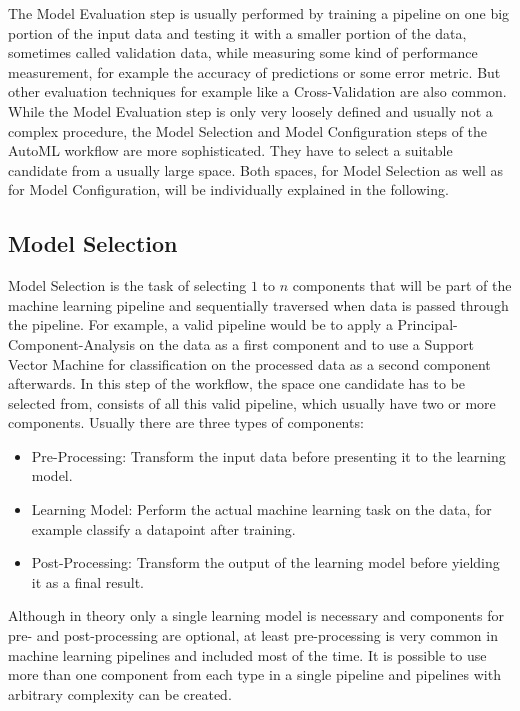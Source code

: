 The Model Evaluation step is usually performed by training a pipeline on one big portion of the input data and testing it with a smaller portion of the data, sometimes called validation data, while measuring some kind of performance measurement, for example the accuracy of predictions or some error metric.
But other evaluation techniques for example like a Cross-Validation are also common.\newline
While the Model Evaluation step is only very loosely defined and usually not a complex procedure, the Model Selection and Model Configuration steps of the AutoML workflow are more sophisticated.
They have to select a suitable candidate from a usually large space. 
Both spaces, for Model Selection as well as for Model Configuration, will be individually explained in the following.

\subsection{Model Selection}
\label{sec:theory:automl:selection}
Model Selection is the task of selecting $1$ to $n$ components that will be part of the machine learning pipeline and sequentially traversed when data is passed through the pipeline.
For example, a valid pipeline would be to apply a Principal-Component-Analysis on the data as a first component and to use a Support Vector Machine for classification on the processed data as a second component afterwards.
In this step of the workflow, the space one candidate has to be selected from, consists of all this valid pipeline, which usually have two or more components.\newline
Usually there are three types of components:
\begin{itemize}
    \item Pre-Processing: Transform the input data before presenting it to the learning model.
    \item Learning Model: Perform the actual machine learning task on the data, for example classify a datapoint after training.
    \item Post-Processing: Transform the output of the learning model before yielding it as a final result.
\end{itemize}
Although in theory only a single learning model is necessary and components for pre- and post-processing are optional, at least pre-processing is very common in machine learning pipelines and included most of the time.\newline
It is possible to use more than one component from each type in a single pipeline and pipelines with arbitrary complexity can be created.
